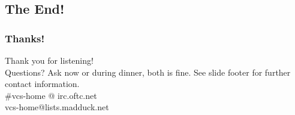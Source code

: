\documentclass[t]{beamer}
\begin{document}
\subsection{The End!}

\begin{frame}
	\frametitle{Thanks!}
		\begin{center}
			\vfill
			Thank you for listening!\\
			\vfill
			Questions? Ask now or during dinner, both is fine.
			\vfill
			See slide footer for further contact information.\\
			\vfill
			\#vcs-home @ irc.oftc.net\\
			vcs-home@lists.madduck.net
			\vfill
		\end{center}
\end{frame}
\end{document}
